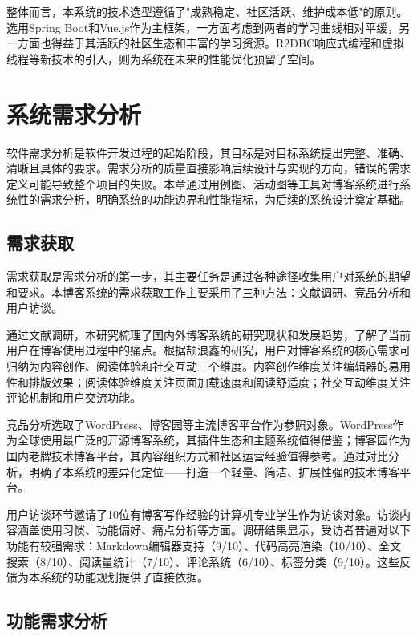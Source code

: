 \documentclass[UTF8,AutoFakeBold=1,AutoFakeSlant,zihao=-4]{SCAU}
\begin{document}
 整体而言，本系统的技术选型遵循了"成熟稳定、社区活跃、维护成本低"的原则。选用Spring Boot和Vue.js作为主框架，一方面考虑到两者的学习曲线相对平缓，另一方面也得益于其活跃的社区生态和丰富的学习资源。R2DBC响应式编程和虚拟线程等新技术的引入，则为系统在未来的性能优化预留了空间。

 \section{系统需求分析}

 软件需求分析是软件开发过程的起始阶段，其目标是对目标系统提出完整、准确、清晰且具体的要求{\citep{李杰2018}}。需求分析的质量直接影响后续设计与实现的方向，错误的需求定义可能导致整个项目的失败。本章通过用例图、活动图等工具对博客系统进行系统性的需求分析，明确系统的功能边界和性能指标，为后续的系统设计奠定基础。

 \subsection{需求获取}

 需求获取是需求分析的第一步，其主要任务是通过各种途径收集用户对系统的期望和要求。本博客系统的需求获取工作主要采用了三种方法：文献调研、竞品分析和用户访谈。

 通过文献调研，本研究梳理了国内外博客系统的研究现状和发展趋势，了解了当前用户在博客使用过程中的痛点。根据颉浪鑫{\citep{颉浪鑫2023}}的研究，用户对博客系统的核心需求可归纳为内容创作、阅读体验和社交互动三个维度。内容创作维度关注编辑器的易用性和排版效果；阅读体验维度关注页面加载速度和阅读舒适度；社交互动维度关注评论机制和用户交流功能。

 竞品分析选取了WordPress、博客园等主流博客平台作为参照对象。WordPress作为全球使用最广泛的开源博客系统，其插件生态和主题系统值得借鉴；博客园作为国内老牌技术博客平台，其内容组织方式和社区运营经验值得参考。通过对比分析，明确了本系统的差异化定位——打造一个轻量、简洁、扩展性强的技术博客平台。

 用户访谈环节邀请了10位有博客写作经验的计算机专业学生作为访谈对象。访谈内容涵盖使用习惯、功能偏好、痛点分析等方面。调研结果显示，受访者普遍对以下功能有较强需求：Markdown编辑器支持（9/10）、代码高亮渲染（10/10）、全文搜索（8/10）、阅读量统计（7/10）、评论系统（6/10）、标签分类（9/10）。这些反馈为本系统的功能规划提供了直接依据。

 \subsection{功能需求分析}
\end{document}
